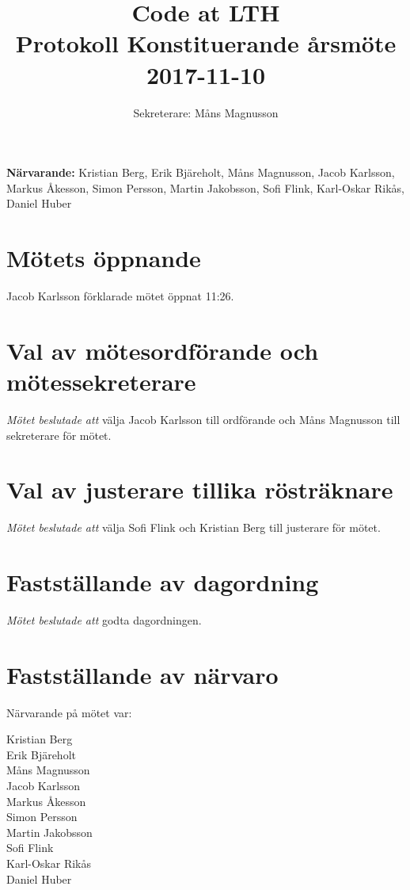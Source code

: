 \documentclass{article}
\begin{document}
\title{
\Huge{Code at LTH}\\
Protokoll Konstituerande årsmöte 2017-11-10}
\author{ Sekreterare: Måns Magnusson}
\date{}
\maketitle
\thispagestyle{first}

{\bf Närvarande:} Kristian Berg, Erik Bjäreholt, Måns Magnusson, Jacob Karlsson, Markus Åkesson, Simon Persson, Martin Jakobsson, Sofi Flink, Karl-Oskar Rikås, Daniel Huber\\


\section{Mötets öppnande}
Jacob Karlsson förklarade mötet öppnat 11:26.

\section{Val av mötesordförande och mötessekreterare}
\emph{Mötet beslutade att} välja Jacob Karlsson till ordförande och Måns Magnusson till sekreterare för mötet.

\section{Val av justerare tillika rösträknare} 
\emph{Mötet beslutade att} välja Sofi Flink och Kristian Berg till justerare för mötet.

\section{Fastställande av dagordning}

\emph{Mötet beslutade att} godta dagordningen.

\section{Fastställande av närvaro}
Närvarande på mötet var: 
\begin{description}
\item[Kristian Berg]
\item[Erik Bjäreholt]
\item[Måns Magnusson]
\item[Jacob Karlsson]
\item[Markus Åkesson]
\item[Simon Persson ]
\item[Martin Jakobsson]
\item[Sofi Flink]
\item[Karl-Oskar Rikås]
\item[Daniel Huber]
\end{description}
\end{document}
